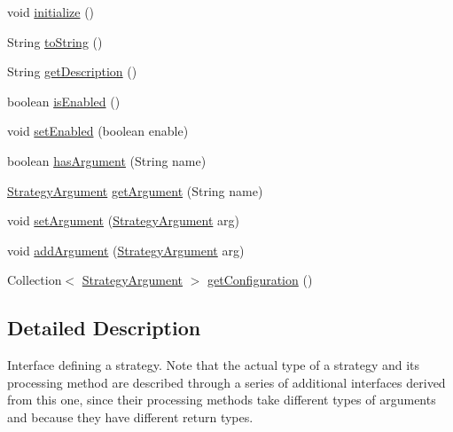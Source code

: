 \begin{DoxyCompactItemize}
\item 
void \hyperlink{interfacech_1_1zhaw_1_1ba10__bsha__1_1_1strategies_1_1IStrategy_afb7e5e1e93cea653f1754dbd60db4ec8}{initialize} ()
\item 
String \hyperlink{interfacech_1_1zhaw_1_1ba10__bsha__1_1_1strategies_1_1IStrategy_a2b109250e12270545e1c342c9d136bcd}{toString} ()
\item 
String \hyperlink{interfacech_1_1zhaw_1_1ba10__bsha__1_1_1strategies_1_1IStrategy_ab1ebc130da7b0792d736a8b5f9cf595d}{getDescription} ()
\item 
boolean \hyperlink{interfacech_1_1zhaw_1_1ba10__bsha__1_1_1strategies_1_1IStrategy_a64149a1aad4d39dde043d11b2e7cc673}{isEnabled} ()
\item 
void \hyperlink{interfacech_1_1zhaw_1_1ba10__bsha__1_1_1strategies_1_1IStrategy_ae95d5ca1a67248a3c6dd80b40d6f6a32}{setEnabled} (boolean enable)
\item 
boolean \hyperlink{interfacech_1_1zhaw_1_1ba10__bsha__1_1_1strategies_1_1IStrategy_a32756f860175f58c3d01b453cdc46bc2}{hasArgument} (String name)
\item 
\hyperlink{classch_1_1zhaw_1_1ba10__bsha__1_1_1StrategyArgument}{StrategyArgument} \hyperlink{interfacech_1_1zhaw_1_1ba10__bsha__1_1_1strategies_1_1IStrategy_acc7ef9593926bb88c142d296332525cc}{getArgument} (String name)
\item 
void \hyperlink{interfacech_1_1zhaw_1_1ba10__bsha__1_1_1strategies_1_1IStrategy_aa5cbdd49578bcc84207fc073bc91da99}{setArgument} (\hyperlink{classch_1_1zhaw_1_1ba10__bsha__1_1_1StrategyArgument}{StrategyArgument} arg)
\item 
void \hyperlink{interfacech_1_1zhaw_1_1ba10__bsha__1_1_1strategies_1_1IStrategy_a503733cf208ec99900463a36b2fea6b2}{addArgument} (\hyperlink{classch_1_1zhaw_1_1ba10__bsha__1_1_1StrategyArgument}{StrategyArgument} arg)
\item 
Collection$<$ \hyperlink{classch_1_1zhaw_1_1ba10__bsha__1_1_1StrategyArgument}{StrategyArgument} $>$ \hyperlink{interfacech_1_1zhaw_1_1ba10__bsha__1_1_1strategies_1_1IStrategy_aa03517aa764bf207ef9fccc86102ca85}{getConfiguration} ()
\end{DoxyCompactItemize}


\subsection{Detailed Description}
Interface defining a strategy. Note that the actual type of a strategy and its processing method are described through a series of additional interfaces derived from this one, since their processing methods take different types of arguments and because they have different return types.

